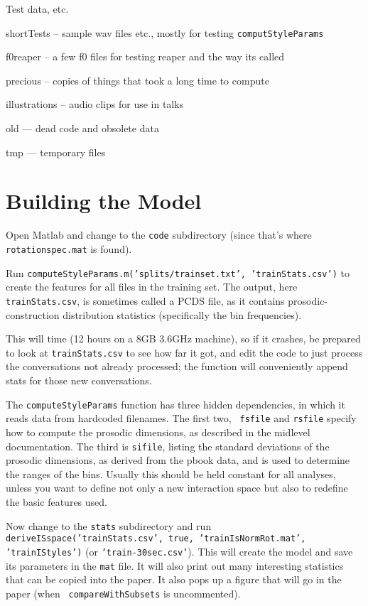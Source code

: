 \documentclass[11pt]{article}
\begin{document}
Test data, etc. 

\begin{description}  
\item{shortTests}  -- sample wav files etc., mostly for testing {\tt computStyleParams}
\item{f0reaper} -- a few f0 files for testing reaper and the way its called
\item{precious} -- copies of things that took a long time to compute
\item{illustrations} -- audio clips for use in talks
\item{old} --- dead code and obsolete data
\item{tmp} --- temporary files 
\end{description}



\section{Building the Model}

Open Matlab and change to the {\tt code} subdirectory (since that's
where {\tt rotationspec.mat} is found).

Run {\tt computeStyleParams.m('splits/trainset.txt',
  'trainStats.csv')} to create the features for all files in the
training set.  The output, here {\tt trainStats.csv}, is sometimes
called a PCDS file, as it contains prosodic-construction distribution
statistics (specifically the bin frequencies).

This will time (12 hours on a 8GB 3.6GHz machine), so if it crashes,
be prepared to look at {\tt trainStats.csv} to see how far it got, and
edit the code to just process the conversations not already processed;
the function will conveniently append stats for those new
conversations.

The {\tt computeStyleParams} function has three hidden dependencies,
in which it reads data from hardcoded filenames.  The first two, {\tt
  fsfile} and {\tt rsfile} specify how to compute the prosodic
dimensions, as described in the midlevel documentation. The third is
{\tt sifile}, listing the standard deviations of the prosodic
dimensions, as derived from the pbook data, and is used to determine
the ranges of the bins. Usually this should be held constant for all
analyses, unless you want to define not only a new interaction space
but also to redefine the basic features used.

\medskip
Now change to the {\tt stats} subdirectory and run {\tt
  deriveISspace('trainStats.csv', true, 'trainIsNormRot.mat',
  'trainIStyles')} (or {\tt 'train-30sec.csv'}).  This will create the
model and save its parameters in the {\tt mat} file. It will also
print out many interesting statistics that can be copied into the
paper.  It also pops up a figure that will go in the paper (when {\tt
  compareWithSubsets} is uncommented).
\end{document}
